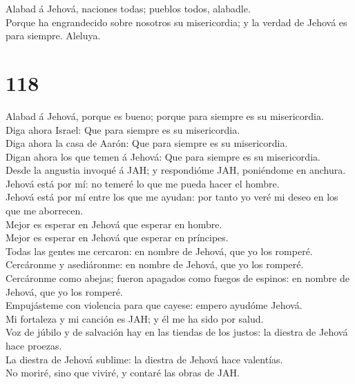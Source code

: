  Alabad á Jehová, naciones todas; pueblos todos, alabadle.\\
 Porque ha engrandecido sobre nosotros su misericordia; y la
verdad de Jehová es para siempre. Aleluya.

\hypertarget{section-117}{%
\section{118}\label{section-117}}

 Alabad á Jehová, porque es bueno; porque para siempre es su
misericordia.\\
 Diga ahora Israel: Que para siempre es su misericordia.\\
 Diga ahora la casa de Aarón: Que para siempre es su
misericordia.\\
 Digan ahora los que temen á Jehová: Que para siempre es su
misericordia.\\
 Desde la angustia invoqué á JAH; y respondióme JAH,
poniéndome en anchura.\\
 Jehová está por mí: no temeré lo que me pueda hacer el
hombre.\\
 Jehová está por mí entre los que me ayudan: por tanto yo
veré mi deseo en los que me aborrecen.\\
 Mejor es esperar en Jehová que esperar en hombre.\\
 Mejor es esperar en Jehová que esperar en príncipes.\\
 Todas las gentes me cercaron: en nombre de Jehová, que yo
los romperé.\\
 Cercáronme y asediáronme: en nombre de Jehová, que yo los
romperé.\\
 Cercáronme como abejas; fueron apagados como fuegos de
espinos: en nombre de Jehová, que yo los romperé.\\
 Empujásteme con violencia para que cayese: empero ayudóme
Jehová.\\
 Mi fortaleza y mi canción es JAH; y él me ha sido por
salud.\\
 Voz de júbilo y de salvación hay en las tiendas de los
justos: la diestra de Jehová hace proezas.\\
 La diestra de Jehová sublime: la diestra de Jehová hace
valentías.\\
 No moriré, sino que viviré, y contaré las obras de JAH.\\
